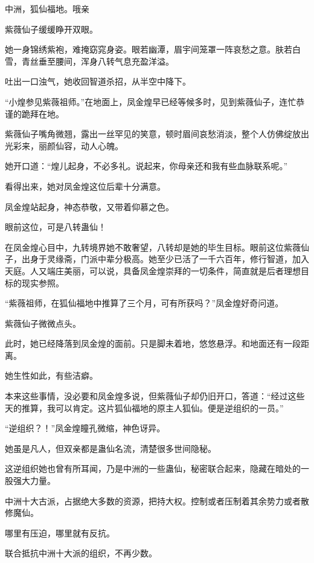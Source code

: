 
\begin{this_body}

中洲，狐仙福地。哦亲

紫薇仙子缓缓睁开双眼。

她一身锦绣紫袍，难掩窈窕身姿。眼若幽潭，眉宇间笼罩一阵哀愁之意。肤若白雪，青丝垂至腰间，浑身八转气息充盈洋溢。

吐出一口浊气，她收回智道杀招，从半空中降下。

“小煌参见紫薇祖师。”在地面上，凤金煌早已经等候多时，见到紫薇仙子，连忙恭谨的跪拜在地。

紫薇仙子嘴角微翘，露出一丝罕见的笑意，顿时眉间哀愁消淡，整个人仿佛绽放出光彩来，丽颜仙容，动人心魄。

她开口道：“煌儿起身，不必多礼。说起来，你母亲还和我有些血脉联系呢。”

看得出来，她对凤金煌这位后辈十分满意。

凤金煌站起身，神态恭敬，又带着仰慕之色。

眼前这位，可是八转蛊仙！

在凤金煌心目中，九转境界她不敢奢望，八转却是她的毕生目标。眼前这位紫薇仙子，出身于灵缘斋，门派中辈分极高。她至少已活了一千六百年，修行智道，加入天庭。人又端庄美丽，可以说，具备凤金煌崇拜的一切条件，简直就是后者理想目标的现实参照。

“紫薇祖师，在狐仙福地中推算了三个月，可有所获吗？”凤金煌好奇问道。

紫薇仙子微微点头。

此时，她已经降落到凤金煌的面前。只是脚未着地，悠悠悬浮。和地面还有一段距离。

她生性如此，有些洁癖。

本来这些事情，没必要和凤金煌多说，但紫薇仙子却仍旧开口，答道：“经过这些天的推算，我可以肯定。这片狐仙福地的原主人狐仙。便是逆组织的一员。”

“逆组织？！”凤金煌瞳孔微缩，神色讶异。

她虽是凡人，但双亲都是蛊仙名流，清楚很多世间隐秘。

这逆组织她也曾有所耳闻，乃是中洲的一些蛊仙，秘密联合起来，隐藏在暗处的一股强大力量。

中洲十大古派，占据绝大多数的资源，把持大权。控制或者压制着其余势力或者散修魔仙。

哪里有压迫，哪里就有反抗。

联合抵抗中洲十大派的组织，不再少数。


\end{this_body}
